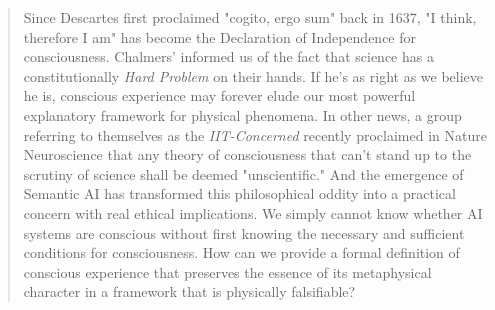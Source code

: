 \documentclass[runningheads]{llncs}
\begin{document}
\begin{abstract}
Since Descartes first proclaimed "cogito, ergo sum" back in 1637, "I think, therefore I am" has become the Declaration of Independence for consciousness. Chalmers' informed us of the fact that science has a constitutionally \textit{Hard Problem} on their hands. If he's as right as we believe he is, conscious experience may forever elude our most powerful explanatory framework for physical phenomena. In other news, a group referring to themselves as the \textit{IIT-Concerned} recently proclaimed in Nature Neuroscience that any theory of consciousness that can't stand up to the scrutiny of science shall be deemed "unscientific." And the emergence of Semantic AI has transformed this philosophical oddity into a practical concern with real ethical implications. We simply cannot know whether AI systems are conscious without first knowing the necessary and sufficient conditions for consciousness. How can we provide a formal definition of conscious experience that preserves the essence of its metaphysical character in a framework that is physically falsifiable? 

\end{abstract}
\end{document}

